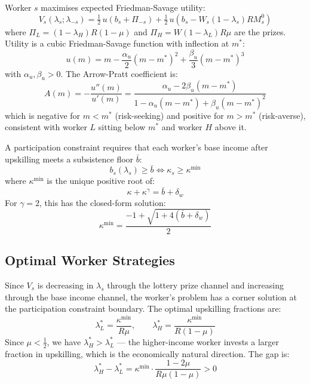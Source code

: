 \documentclass[12pt,a4paper]{article}
\begin{document}
Worker $s$ maximises expected Friedman-Savage utility:
\begin{equation}
  V_s(\lambda_s;\lambda_{-s}) = \tfrac{1}{2}\,u(b_s + \Pi_{-s})
  + \tfrac{1}{2}\,u(b_s - W_s(1-\lambda_s)RM_s^0)
  \label{eq:utility}
\end{equation}
where $\Pi_L = (1-\lambda_H)R(1-\mu)$ and $\Pi_H = W(1-\lambda_L)R\mu$
are the prizes. Utility is a cubic Friedman-Savage function with inflection
at $m^*$:
\begin{equation}
  u(m) = m - \frac{\alpha_u}{2}(m-m^*)^2 + \frac{\beta_u}{3}(m-m^*)^3
  \label{eq:cubic_u}
\end{equation}
with $\alpha_u, \beta_u > 0$. The Arrow-Pratt coefficient is:
\begin{equation}
  A(m) = -\frac{u''(m)}{u'(m)}
  = \frac{\alpha_u - 2\beta_u(m-m^*)}{1 - \alpha_u(m-m^*) + \beta_u(m-m^*)^2}
  \label{eq:AP}
\end{equation}
which is negative for $m < m^*$ (risk-seeking) and positive for $m > m^*$
(risk-averse), consistent with worker $L$ sitting below $m^*$ and
worker $H$ above it.

A participation constraint requires that each worker's base income
after upskilling meets a subsistence floor $\bar{b}$:
\begin{equation}
  b_s(\lambda_s) \geq \bar{b} \iff \kappa_s \geq \kappa^{\min}
  \label{eq:participation}
\end{equation}
where $\kappa^{\min}$ is the unique positive root of:
\begin{equation}
  \kappa + \kappa^\gamma = \bar{b} + \delta_w
  \label{eq:kappa_constraint}
\end{equation}
For $\gamma = 2$, this has the closed-form solution:
\begin{equation}
  \kappa^{\min} = \frac{-1 + \sqrt{1 + 4(\bar{b}+\delta_w)}}{2}
  \label{eq:kappa_gamma2}
\end{equation}

\subsection{Optimal Worker Strategies}

Since $V_s$ is decreasing in $\lambda_s$ through the lottery prize channel
and increasing through the base income channel, the worker's problem has a
corner solution at the participation constraint boundary.
The optimal upskilling fractions are:
\begin{equation}
  \lambda_L^* = \frac{\kappa^{\min}}{R\mu},
  \qquad
  \lambda_H^* = \frac{\kappa^{\min}}{R(1-\mu)}
  \label{eq:lambda_star}
\end{equation}
Since $\mu < \frac{1}{2}$, we have $\lambda_H^* > \lambda_L^*$ — the
higher-income worker invests a larger fraction in upskilling,
which is the economically natural direction.
The gap is:
\begin{equation}
  \lambda_H^* - \lambda_L^* = \kappa^{\min}\cdot\frac{1-2\mu}{R\mu(1-\mu)} > 0
\end{equation}
\end{document}
